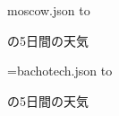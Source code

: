 \documentclass[20pt]{extreport}
\begin{document}
\newread\injson \openin\injson moscow.json
\read\injson to \forecast
\readJson{\jsonForecast}{\forecast}
\closein\injson

\readJson{\jsonCity}{{\cityValue}}
\city の5日間の天気
\showForecast{\weathewValues}

\clearpage

\newread\injson \openin\injson=bachotech.json
\read\injson to \forecast
\readJson{\jsonForecast}{\forecast}
\closein\injson

\readJson{\jsonCity}{{\cityValue}}
\city の5日間の天気
\showForecast{\weathewValues}
\end{document}
